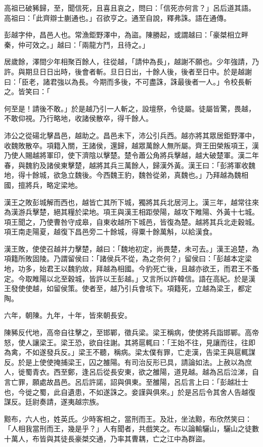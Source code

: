 \begin{pinyinscope}
高祖已破豨歸，至，聞信死，且喜且哀之，問曰：「信死亦何言？」呂后道其語。高祖曰：「此齊辯士蒯通也。」召欲亨之。通至自說，釋弗誅。語在通傳。

彭越字仲，昌邑人也。常漁鉅野澤中，為盜。陳勝起，或謂越曰：「豪桀相立畔秦，仲可效之。」越曰：「兩龍方鬥，且待之。」

居歲餘，澤間少年相聚百餘人，往從越，「請仲為長」，越謝不願也。少年強請，乃許。與期旦日日出時，後會者斬。旦日日出，十餘人後，後者至日中。於是越謝曰：「臣老，諸君強以為長。今期而多後，不可盡誅，誅最後者一人。」令校長斬之。皆笑曰：「

何至是！請後不敢。」於是越乃引一人斬之，設壇祭，令徒屬。徒屬皆驚，畏越，不敢仰視。乃行略地，收諸侯散卒，得千餘人。

沛公之從碭北擊昌邑，越助之。昌邑未下，沛公引兵西。越亦將其眾居鉅野澤中，收魏敗散卒。項籍入關，王諸侯，還歸，越眾萬餘人無所屬。齊王田榮叛項王，漢乃使人賜越將軍印，使下濟陰以擊楚。楚令蕭公角將兵擊越，越大破楚軍。漢二年春，與魏豹及諸侯東擊楚，越將其兵三萬餘人，歸漢外黃。漢王曰：「彭將軍收魏地，得十餘城，欲急立魏後。今西魏王豹，魏咎從弟，真魏也。」乃拜越為魏相國，擅將兵，略定梁地。

漢王之敗彭城解而西也，越皆亡其所下城，獨將其兵北居河上。漢三年，越常往來為漢游兵擊楚，絕其糧於梁地。項王與漢王相距滎陽，越攻下睢陽、外黃十七城。項王聞之，乃使曹咎守成皋，自東收越所下城邑，皆復為楚。越將其兵北走穀城。項王南走陽夏，越復下昌邑旁二十餘城，得粟十餘萬斛，以給漢食。

漢王敗，使使召越并力擊楚，越曰：「魏地初定，尚畏楚，未可去。」漢王追楚，為項籍所敗固陵。乃謂留侯曰：「諸侯兵不從，為之奈何？」留侯曰：「彭越本定梁地，功多，始君王以魏豹故，拜越為相國。今豹死亡後，且越亦欲王，而君王不蚤定。今取睢陽以北至穀城，皆許以王彭越。」又言所以許韓信。語在高紀。於是漢王發使使越，如留侯策。使者至，越乃引兵會垓下。項籍死，立越為梁王，都定陶。

六年，朝陳。九年，十年，皆來朝長安。

陳豨反代地，高帝自往擊之，至邯鄲，徵兵梁。梁王稱病，使使將兵詣邯鄲。高帝怒，使人讓梁王。梁王恐，欲自往謝。其將扈輒曰：「王始不往，見讓而往，往即為禽，不如遂發兵反。」梁王不聽，稱病。梁太僕有罪，亡走漢，告梁王與扈輒謀反。於是上使使掩捕梁王，囚之雒陽。有司治反形已具，請論如法。上赦以為庶人，徙蜀青衣。西至鄭，逢呂后從長安東，欲之雒陽，道見越。越為呂后泣涕，自言亡罪，願處故昌邑。呂后許諾，詔與俱東。至雒陽，呂后言上曰：「彭越壯士也，今徙之蜀，此自遺患，不如遂誅之。妾謹與俱來。」於是呂后令其舍人告越復謀反。廷尉奏請，遂夷越宗族。

黥布，六人也，姓英氏。少時客相之，當刑而王。及壯，坐法黥，布欣然笑曰：「人相我當刑而王，幾是乎？」人有聞者，共戲笑之。布以論輸驪山，驪山之徒數十萬人，布皆與其徒長豪桀交通，乃率其曹耦，亡之江中為群盜。


\end{pinyinscope}
